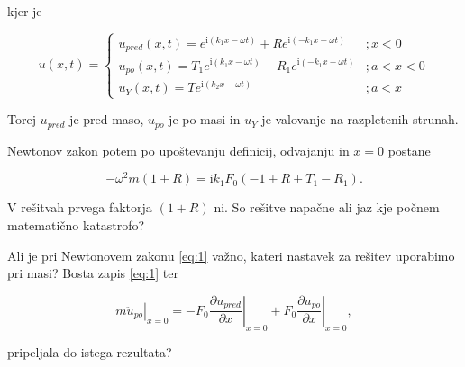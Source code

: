 \documentclass[11pt]{article}
\begin{document}
kjer je

\[ u(x, t) = \begin{cases}
              u_{pred} (x, t) = e^{\mathrm{i} (k_1 x - \omega t)} + R e^{\mathrm{i} (- k_1 x - \omega t)} &; x < 0 \\
              u_{po} (x, t) = T_1e^{\mathrm{i} (k_1 x - \omega t)} + R_1 e^{\mathrm{i} (-k_1 x - \omega t)} & ; a < x < 0 \\
              u_{Y} (x, t) = Te^{\mathrm{i} (k_2 x - \omega t)} &; a < x
             \end{cases}
\]

Torej \(u_{pred}\) je pred maso, \(u_{po}\) je po masi in \(u_Y\) je valovanje na razpletenih strunah.

Newtonov zakon potem po upoštevanju definicij, odvajanju in \(x = 0\) postane

\[ - \omega ^2 m (1 + R) = \mathrm{i} k_1 F_0 \left( -1 + R + T_1 - R_1 \right).
\]

V rešitvah prvega faktorja \((1 + R)\) ni. So rešitve napačne ali jaz kje počnem matematično katastrofo?

Ali je pri Newtonovem zakonu \ref{eq:1} važno, kateri nastavek za rešitev uporabimo pri masi? Bosta zapis \ref{eq:1} ter

\[  \left. m \ddot{u}_{po} \right|_{x = 0} = - F_0 \left. \frac{\partial u_{pred}}{\partial x} \right|_{x = 0} + F_0 \left. \frac{\partial u_{po}}{\partial x} \right|_{x = 0},
\]

pripeljala do istega rezultata?
\end{document}
